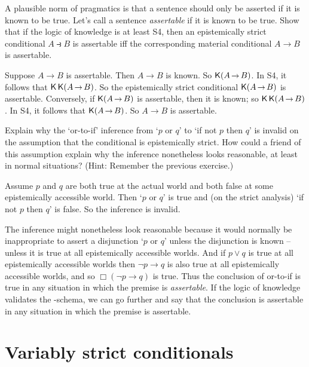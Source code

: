 \begin{exercise}\label{ex:assertable}
  A plausible norm of pragmatics is that a sentence should only be asserted if
  it is known to be true. Let's call a sentence \emph{assertable} if it is known
  to be true. Show that if the logic of knowledge is at least S4, then an
  epistemically strict conditional $A \strictif B$ is assertable iff the
  corresponding material conditional $A \to B$ is assertable.
\end{exercise}
\begin{solution}
  Suppose $A \to B$ is assertable. Then $A\to B$ is known. So $\Kn (A \to
  B)$. In S4, it follows that $\Kn\Kn(A \to B)$. So the epistemically strict
  conditional $\Kn(A \to B)$ is assertable. Conversely, if $\Kn(A \to B)$ is
  assertable, then it is known; so $\Kn\Kn(A \to B)$. In S4, it follows that
  $\Kn(A \to B)$. So $A \to B$ is assertable.
\end{solution}

\begin{exercise}
  Explain why the `or-to-if' inference from `$p$ or $q$' to `if not $p$ then
  $q$' is invalid on the assumption that the conditional is epistemically
  strict. How could a friend of this assumption explain why the inference
  nonetheless looks reasonable, at least in normal situations? (Hint: Remember
  the previous exercise.)
\end{exercise}
\begin{solution}
  Assume $p$ and $q$ are both true at the actual world and both false at some
  epistemically accessible world. Then `$p$ or $q$' is true and (on the strict
  analysis) `if not $p$ then $q$' is false. So the inference is invalid.

  The inference might nonetheless look reasonable because it would normally be
  inappropriate to assert a disjunction `$p$ or $q$' unless the disjunction is
  known -- unless it is true at all epistemically accessible worlds. And if
  $p \lor q$ is true at all epistemically accessible worlds then $\neg p \to q$
  is also true at all epistemically accessible worlds, and so $\Box(\neg p \to q)$ is
  true. Thus the conclusion of or-to-if is true in any situation in which the
  premise is \emph{assertable}. If the logic of knowledge validates the
  -schema, we can go further and say that the conclusion is assertable in
  any situation in which the premise is assertable.
\end{solution}


\section{Variably strict conditionals}

